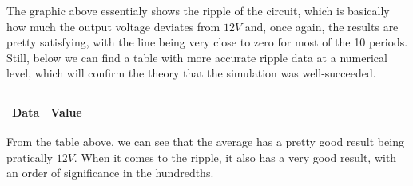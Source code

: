 The graphic above essentialy shows the ripple of the circuit, which is basically how much the output voltage deviates from $12V$ and, once again, the results are pretty satisfying, with the line being very close to zero for most of the 10 periods. Still, below we can find a table with more accurate ripple data at a numerical level, which will confirm the theory that the simulation was well-succeeded.


\begin{table}[H] \centering
  \begin{tabular}{|l|r|}
    \hline    
    {\bf Data} & {\bf Value} \\ \hline
    
  \end{tabular}
  \caption{}
 \label{tab:op}
\end{table}

From the table above, we can see that the average has a pretty good result being pratically $12V$. When it comes to the ripple, it also has a very good result, with an order of significance in the hundredths.
